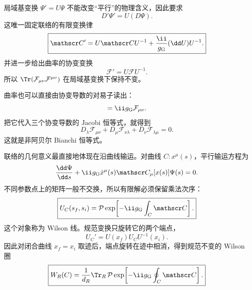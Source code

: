 局域基变换 $\Psi'=U\Psi$ 不能改变“平行”的物理含义，因此要求
\begin{equation}
 D'\Psi'=U(D\Psi).
 \label{eq:covariant-derivative-covariance-dp68}
\end{equation}
这唯一固定联络的有限变换律
\begin{equation}
 \boxed{
 \mathscr C'
 =U\mathscr C U^{-1}
 +\frac{\ii}{g_{\rm G}}(\dd U)U^{-1}.}
 \label{eq:finite-gauge-connection-dp11}
\end{equation}
并进一步给出曲率的协变变换
\begin{equation}
 \boxed{\mathcal F'=U\mathcal F U^{-1}.}
 \label{eq:curvature-gauge-covariance-dp68}
\end{equation}
所以 $\Tr(\mathcal F_{\mu\nu}\mathcal F^{\mu\nu})$ 在局域基变换下保持不变。

曲率也可以直接由协变导数的对易子读出：
\begin{equation}
 [D_\mu,D_\nu]=\ii g_{\rm G}\mathcal F_{\mu\nu}.
 \label{eq:covariant-commutator-curvature-dp68}
\end{equation}
把它代入三个协变导数的 Jacobi 恒等式，就得到
\begin{equation}
 \boxed{
 D_\lambda\mathcal F_{\mu\nu}
 +D_\mu\mathcal F_{\nu\lambda}
 +D_\nu\mathcal F_{\lambda\mu}=0.}
 \label{eq:nonabelian-bianchi-dp11}
\end{equation}
这就是非阿贝尔 Bianchi 恒等式。

联络的几何意义最直接地体现在沿曲线输运。对曲线 $C:x^\mu(s)$，平行输运方程为
\begin{equation}
 \frac{\dd\Psi}{\dd s}
 +\ii g_{\rm G}\dot x^\mu(s)\mathscr C_\mu[x(s)]\Psi(s)=0.
 \label{eq:parallel-transport-ode-dp68}
\end{equation}
不同参数点上的矩阵一般不交换，所以有限解必须保留乘法次序：
\begin{equation}
 \boxed{
 U_C(s_f,s_i)
 =\mathcal P\exp\!\left[-\ii g_{\rm G}\int_C\mathscr C\right].}
 \label{eq:wilson-line-general-dp11}
\end{equation}
这个对象称为 Wilson 线。规范变换只旋转它的两个端点，
\begin{equation}
 \boxed{
 U_C' =U(x_f)U_CU^{-1}(x_i).}
 \label{eq:wilson-endpoint-covariance-dp68}
\end{equation}
因此对闭合曲线 $x_f=x_i$ 取迹后，端点旋转在迹中相消，得到规范不变的 Wilson 圈
\begin{equation}
 \boxed{
 W_R(C)=\frac1{d_R}\Tr_R\,
 \mathcal P\exp\!\left[-\ii g_{\rm G}\oint_C\mathscr C\right].}
 \label{eq:wilson-loop-general-dp11}
\end{equation}

